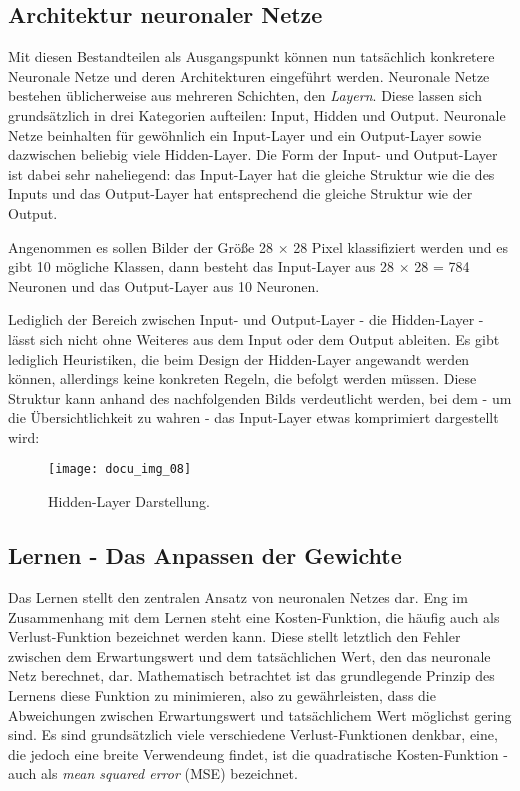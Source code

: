 \subsection{Architektur neuronaler Netze}

Mit diesen Bestandteilen als Ausgangspunkt können nun tatsächlich konkretere Neuronale Netze und deren Architekturen
eingeführt werden. Neuronale Netze bestehen üblicherweise aus mehreren Schichten, den \textit{Layern}. Diese lassen
sich grundsätzlich in drei Kategorien aufteilen: Input, Hidden und Output. Neuronale Netze beinhalten für gewöhnlich
ein Input-Layer und ein Output-Layer sowie dazwischen beliebig viele Hidden-Layer. Die Form der Input- und Output-Layer
ist dabei sehr naheliegend: das Input-Layer hat die gleiche Struktur wie die des Inputs und das Output-Layer hat
entsprechend die gleiche Struktur wie der Output.

Angenommen es sollen Bilder der Größe 28 \(\times\) 28 Pixel klassifiziert werden und es gibt 10 mögliche Klassen, dann besteht das
Input-Layer aus 28 \(\times\) 28 = 784 Neuronen und das Output-Layer aus 10 Neuronen.

Lediglich der Bereich zwischen Input- und Output-Layer - die Hidden-Layer - lässt sich nicht ohne Weiteres aus dem Input
oder dem Output ableiten. Es gibt lediglich Heuristiken, die beim Design der Hidden-Layer angewandt werden können,
allerdings keine konkreten Regeln, die befolgt werden müssen. Diese Struktur kann anhand des nachfolgenden Bilds
verdeutlicht werden, bei dem - um die Übersichtlichkeit zu wahren - das Input-Layer etwas komprimiert dargestellt wird:

\begin{figure}[h]
    \centering
    \texttt{[image: docu\_img\_08]}
    \caption{Hidden-Layer Darstellung.}
    \label{fig:hidden-layers}
\end{figure}

\subsection{Lernen - Das Anpassen der Gewichte}

Das Lernen stellt den zentralen Ansatz von neuronalen Netzes dar. Eng im Zusammenhang mit dem Lernen steht eine
Kosten-Funktion, die häufig auch als Verlust-Funktion bezeichnet werden kann. Diese stellt letztlich den Fehler zwischen
dem Erwartungswert und dem tatsächlichen Wert, den das neuronale Netz berechnet, dar. Mathematisch betrachtet ist das
grundlegende Prinzip des Lernens diese Funktion zu minimieren, also zu gewährleisten, dass die Abweichungen zwischen
Erwartungswert und tatsächlichem Wert möglichst gering sind. Es sind grundsätzlich viele verschiedene Verlust-Funktionen
denkbar, eine, die jedoch eine breite Verwendeung findet, ist die quadratische Kosten-Funktion - auch als \textit{mean squared
error} (MSE) bezeichnet.

